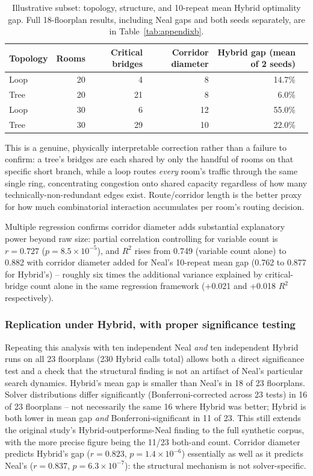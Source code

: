 \documentclass[11pt]{article}
\begin{document}
\begin{table}[h]
\centering
\caption{Illustrative subset: topology, structure, and 10-repeat mean Hybrid optimality gap. Full 18-floorplan results, including Neal gaps and both seeds separately, are in Table~\ref{tab:appendixb}.}
\label{tab:synthetic}
\small
\begin{tabular}{lrrrrr}
\toprule
Topology & Rooms & Critical bridges & Corridor diameter & Hybrid gap (mean of 2 seeds) \\
\midrule
Loop & 20 & 4 & 8 & 14.7\% \\
Tree & 20 & 21 & 8 & 6.0\% \\
Loop & 30 & 6 & 12 & 55.0\% \\
Tree & 30 & 29 & 10 & 22.0\% \\
\bottomrule
\end{tabular}
\end{table}

This is a genuine, physically interpretable correction rather than a failure to confirm: a tree's bridges are each shared by only the handful of rooms on that specific short branch, while a loop routes \emph{every} room's traffic through the same single ring, concentrating congestion onto shared capacity regardless of how many technically-non-redundant edges exist. Route/corridor length is the better proxy for how much combinatorial interaction accumulates per room's routing decision.

Multiple regression confirms corridor diameter adds substantial explanatory power beyond raw size: partial correlation controlling for variable count is $r=0.727$ ($p=8.5\times10^{-5}$), and $R^2$ rises from 0.749 (variable count alone) to 0.882 with corridor diameter added for Neal's 10-repeat mean gap (0.762 to 0.877 for Hybrid's) -- roughly six times the additional variance explained by critical-bridge count alone in the same regression framework (+0.021 and +0.018 $R^2$ respectively).

\subsubsection{Replication under Hybrid, with proper significance testing}
Repeating this analysis with ten independent Neal \emph{and} ten independent Hybrid runs on all 23 floorplans (230 Hybrid calls total) allows both a direct significance test and a check that the structural finding is not an artifact of Neal's particular search dynamics. Hybrid's mean gap is smaller than Neal's in 18 of 23 floorplans. Solver distributions differ significantly (Bonferroni-corrected across 23 tests) in 16 of 23 floorplans -- not necessarily the same 16 where Hybrid was better; Hybrid is both lower in mean gap \emph{and} Bonferroni-significant in 11 of 23. This still extends the original study's Hybrid-outperforms-Neal finding to the full synthetic corpus, with the more precise figure being the 11/23 both-and count. Corridor diameter predicts Hybrid's gap ($r=0.823$, $p=1.4\times10^{-6}$) essentially as well as it predicts Neal's ($r=0.837$, $p=6.3\times10^{-7}$): the structural mechanism is not solver-specific.
\end{document}
